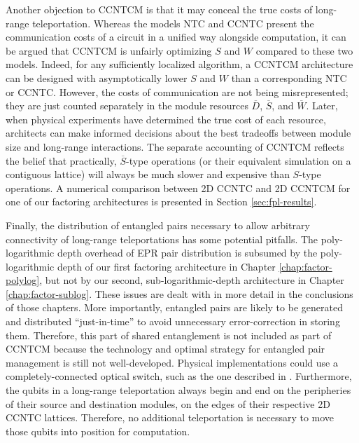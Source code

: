 Another objection to \textsf{CCNTCM} is that it may conceal the true
costs of long-range teleportation. Whereas the models \textsf{NTC} and
\textsf{CCNTC} present the communication costs of a circuit in a unified
way alongside computation, it can be argued that \textsf{CCNTCM} is unfairly
optimizing $S$ and $W$ compared to these two models. Indeed, for any
sufficiently localized algorithm, a \textsf{CCNTCM} architecture can be designed with asymptotically lower $S$ and $W$ than a corresponding \textsf{NTC} or \textsf{CCNTC}. However, the costs of communication are not being
misrepresented; they are just counted separately
in the module resources $\overline{D}$, $\overline{S}$, and
$\overline{W}$. Later, when physical experiments have determined the
true cost of each resource, architects can make informed decisions about
the best tradeoffs between module size and long-range interactions.
The separate accounting of \textsf{CCNTCM} reflects the belief that
practically, $\overline{S}$-type operations (or their equivalent simulation
on a contiguous lattice) will always be much slower
and expensive than $S$-type operations. A numerical comparison between
\textsf{2D CCNTC} and \textsf{2D CCNTCM} for one of our
factoring architectures is presented in Section \ref{sec:fpl-results}.

Finally, the distribution of entangled pairs necessary to allow
arbitrary connectivity of long-range teleportations has some
potential pitfalls. The poly-logarithmic depth overhead
of EPR pair distribution is subsumed by the poly-logarithmic
depth of our first factoring architecture in
Chapter \ref{chap:factor-polylog}, but not by our
second, sub-logarithmic-depth architecture in
Chapter \ref{chap:factor-sublog}. These issues are
dealt with in more detail in the conclusions of those chapters.
More importantly, entangled pairs are likely to be generated
and distributed ``just-in-time'' to avoid unnecessary
error-correction in storing them.
Therefore, this part of shared entanglement is not included as part
of \textsf{CCNTCM} because
the technology and optimal strategy for entangled pair management
is still not well-developed.
Physical implementations could use a completely-connected
optical switch, such as the one described in \cite{Monroe2012}.
Furthermore, the qubits in a long-range teleportation always begin and end
on the peripheries of their source and destination modules,
on the edges of their respective \textsf{2D CCNTC} lattices.
Therefore, no additional teleportation is necessary to move
those qubits into position for computation.

